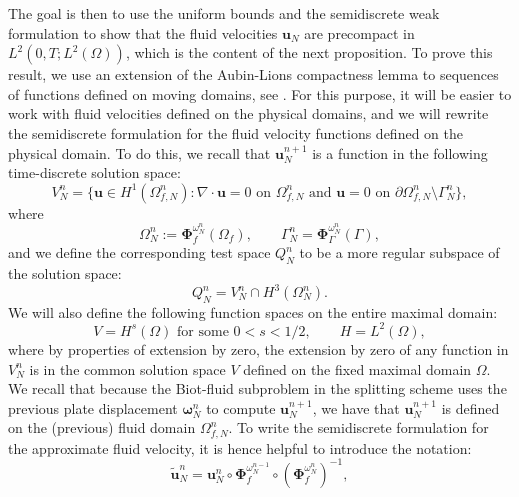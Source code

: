 \documentclass[11pt]{article}
\newcommand{\bd}{\boldsymbol}
\theoremstyle{definition}
\begin{document}
The goal is then to use the uniform bounds and the semidiscrete weak formulation to show that the fluid velocities $\bd{u}_{N}$ are precompact in $L^{2}(0, T; L^{2}(\Omega))$, which is the content of the next proposition. To prove this result, we use an extension of the Aubin-Lions compactness lemma to sequences of functions defined on moving domains, see \cite{AubinLions}. For this purpose, it will be easier to work with fluid velocities defined on the physical domains, and we will rewrite the semidiscrete formulation for the fluid velocity functions defined on the physical domain. To do this, we recall that $\bd{u}^{n + 1}_{N}$ is a function in the following time-discrete solution space:
\begin{equation*}
V^{n}_{N} = \{\bd{u} \in H^{1}(\Omega^{n}_{f, N}) : \nabla \cdot \bd{u} = 0 \text{ on } \Omega^{n}_{f, N} \text{ and } \bd{u} = 0 \text{ on } \partial \Omega^{n}_{f, N} \setminus \Gamma^{n}_{N}\},
\end{equation*}
where 
\begin{equation*}
\Omega^{n}_{N} := \bd{\Phi}^{\omega^{n}_{N}}_{f}(\Omega_{f}), \qquad \Gamma^{n}_{N} = \bd{\Phi}^{\omega^{n}_{N}}_{\Gamma}(\Gamma),
\end{equation*}
and we define the corresponding test space $Q^{n}_{N}$ to be a more regular subspace of the solution space:
\begin{equation}\label{Qmoreregular}
Q^{n}_{N} = V^{n}_{N} \cap H^{3}(\Omega^{n}_{N}).
\end{equation}
We will also define the following function spaces on the entire maximal domain:
\begin{equation*}
V = H^{s}(\Omega) \text{ for some } 0 < s < 1/2, \qquad H = L^{2}(\Omega),
\end{equation*}
where by properties of extension by zero, the extension by zero of any function in $V^{n}_{N}$ is in the common solution space $V$ defined on the fixed maximal domain $\Omega$. We recall that because the Biot-fluid subproblem in the splitting scheme uses the previous plate displacement $\bd{\omega}^{n}_{N}$ to compute $\bd{u}^{n + 1}_{N}$, we have that $\bd{u}^{n + 1}_{N}$ is defined on the (previous) fluid domain $\Omega^{n}_{f, N}$. To write the semidiscrete formulation for the approximate fluid velocity, it is hence helpful to introduce the notation:
\begin{equation}\label{tildeuN}
\tilde{\bd{u}}^{n}_{N} = \bd{u}^{n}_{N} \circ \bd{\Phi}^{\omega^{n - 1}_{N}}_{f} \circ (\bd{\Phi}^{\omega^{n}_{N}}_{f})^{-1},
\end{equation}
\end{document}
